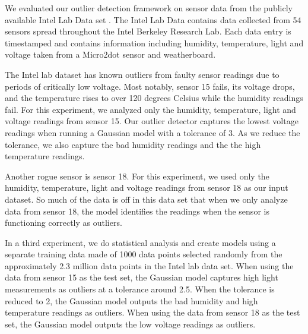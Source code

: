 
We evaluated our outlier detection framework on sensor data from the publicly available Intel Lab Data set \cite{IntelLabData}.
The Intel Lab Data contains data collected from 54 sensors spread throughout the Intel Berkeley Research Lab.
Each data entry is timestamped and contains information including humidity, temperature, light and voltage taken from a Micro2dot sensor and weatherboard.

The Intel lab dataset has known outliers from faulty sensor readings due to periods of critically low voltage.
Most notably, sensor 15 fails, its voltage drops, and the temperature rises to over 120 degrees Celsius while the humidity readings fail. 
For this experiment, we analyzed only the humidity, temperature, light and voltage readings from sensor 15.  
Our outlier detector captures the lowest voltage readings when running a Gaussian model with a tolerance of 3.
As we reduce the tolerance, we also capture the bad humidity readings and the the high temperature readings.

Another rogue sensor is sensor 18.
For this experiment, we used only the humidity, temperature, light and voltage readings from sensor 18 as our input dataset.
So much of the data is off in this data set that when we only analyze data from sensor 18, the model identifies the readings when the sensor is functioning correctly as outliers.

In a third experiment, we do statistical analysis and create models using a separate training data made of 1000 data points selected randomly from the approximately 2.3 million data points in the Intel lab data set.
When using the data from sensor 15 as the test set, the Gaussian model captures high light measurements as outliers at a tolerance around 2.5.
When the tolerance is reduced to 2, the Gaussian model outputs the bad humidity and high temperature readings as outliers.
When using the data from sensor 18 as the test set, the Gaussian model outputs the low voltage readings as outliers.

